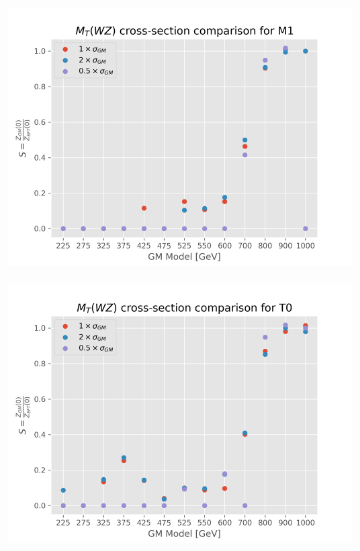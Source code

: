 \documentclass[../Bachelorarbeit.tex]{subfiles}
\begin{document}
\begin{figure}[h]
\begin{subfigure}{0.45\textwidth}
    \end{subfigure}
    \begin{subfigure}{0.45\textwidth}
        \includegraphics[width=\textwidth]{Plots/gm_relevanze/MTWZ_comparision_M1.png}

    \end{subfigure}
    \begin{subfigure}{0.45\textwidth}
        \includegraphics[width=\textwidth]{Plots/gm_relevanze/MTWZ_comparision_T0.png}


\end{subfigure}
\end{figure}
\end{document}
